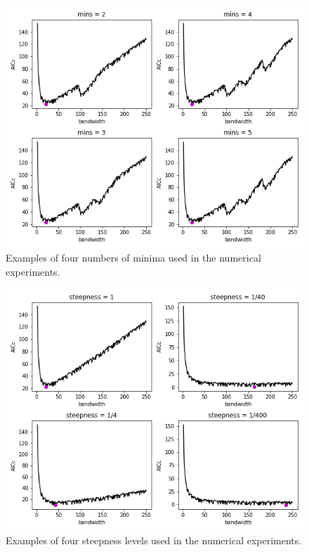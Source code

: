 \documentclass[letterpaper,12pt,twocolumn]{article}
\begin{document}
\begin{figure}[h!]
    \centering
    \includegraphics[width=\textwidth]{../figures/multiple-mins-curves.png}
    \caption{Examples of four numbers of minima used in the numerical experiments.}
    \label{fig:multiple-mins}
\end{figure}

\begin{figure}
    \centering
    \includegraphics[width=\textwidth]{../figures/steep-curves.png}
    \caption{Examples of four steepness levels used in the numerical experiments.}
    \label{fig:steep-curves}
\end{figure}
\end{document}
